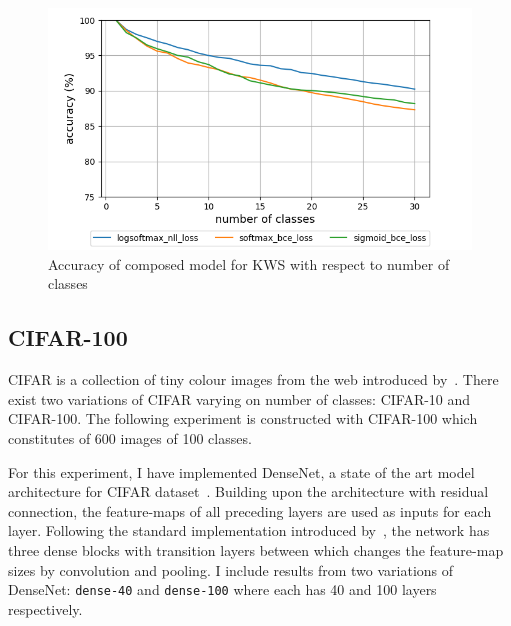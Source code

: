 \documentclass{article}
\begin{document}
\begin{figure}[t]
    \centering
    \includegraphics[scale=0.5,trim={0mm 0mm 0mm 0mm},clip]{kws.png}
    \caption{Accuracy of composed model for KWS with respect to number of classes}
    \label{figure:composed_kws}
\end{figure}

\subsection{CIFAR-100}

CIFAR is a collection of tiny colour images from the web introduced by~\cite{krizhevsky2009learning}. There exist two variations of CIFAR varying on number of classes: CIFAR-10 and CIFAR-100. The following experiment is constructed with CIFAR-100 which constitutes of 600 images of 100 classes.

For this experiment, I have implemented DenseNet, a state of the art model architecture for CIFAR dataset~\cite{huang2017densely}. Building upon the architecture with residual connection, the feature-maps of all preceding layers are used as inputs for each layer. Following the standard implementation introduced by~\cite{huang2017densely}, the network has three dense blocks with transition layers between which changes the feature-map sizes by convolution and pooling. I include results from two variations of DenseNet: \texttt{dense-40} and \texttt{dense-100} where each has 40 and 100 layers respectively.
\end{document}
